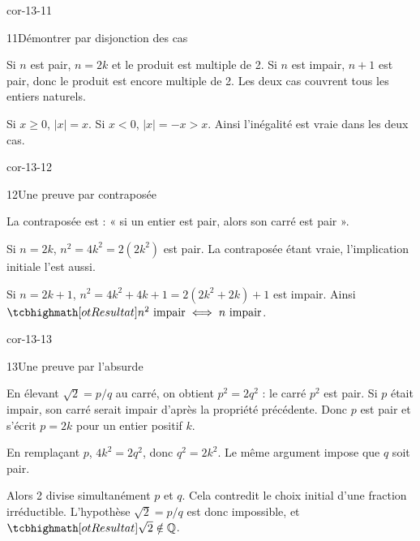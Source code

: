 \begin{blocLivre}{cor-13-11}
\begin{corrige}{11}{Démontrer par disjonction des cas}
\begin{questions}
\item Si $n$ est pair, $n=2k$ et le produit est multiple de 2. Si $n$ est impair, $n+1$ est pair, donc le produit est encore multiple de 2. Les deux cas couvrent tous les entiers naturels.
\item Si $x\geq0$, $|x|=x$. Si $x<0$, $|x|=-x>x$. Ainsi l’inégalité est vraie dans les deux cas.
\end{questions}
\end{corrige}
\end{blocLivre}
\begin{blocLivre}{cor-13-12}
\begin{corrige}{12}{Une preuve par contraposée}
\begin{questions}
\item La contraposée est : « si un entier est pair, alors son carré est pair ».
\item Si $n=2k$, $n^2=4k^2=2(2k^2)$ est pair. La contraposée étant vraie, l’implication initiale l’est aussi.
\item Si $n=2k+1$, $n^2=4k^2+4k+1=2(2k^2+2k)+1$ est impair. Ainsi $\res{n^2\text{ impair}\iff n\text{ impair}}$.
\end{questions}
\end{corrige}
\end{blocLivre}
\begin{blocLivre}{cor-13-13}
\begin{corrige}{13}{Une preuve par l'absurde}
\begin{questions}
\item En élevant $\sqrt2=p/q$ au carré, on obtient $p^2=2q^2$ : le carré $p^2$ est pair.
Si $p$ était impair, son carré serait impair d’après la propriété précédente.
Donc $p$ est pair et s’écrit $p=2k$ pour un entier positif $k$.
\item En remplaçant $p$, $4k^2=2q^2$, donc $q^2=2k^2$.
Le même argument impose que $q$ soit pair.
\item Alors 2 divise simultanément $p$ et $q$.
Cela contredit le choix initial d’une fraction irréductible.
L’hypothèse $\sqrt2=p/q$ est donc impossible, et $\res{\sqrt2\notin\mathbb Q}$.
\end{questions}

\end{corrige}
\end{blocLivre}

